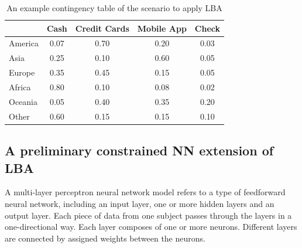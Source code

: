 \documentclass[]{interact}
\theoremstyle{plain}%
\theoremstyle{definition}
\theoremstyle{remark}
\begin{document}
\begin{table}[H]

\caption{\label{tab:example_lba}An example contingency table of the scenario to apply LBA}
\centering
\begin{tabular}[t]{lcccc}
\toprule
\textbf{ } & \textbf{Cash} & \textbf{Credit Cards} & \textbf{Mobile App} & \textbf{Check}\\
\midrule
America & 0.07 & 0.70 & 0.20 & 0.03\\
Asia & 0.25 & 0.10 & 0.60 & 0.05\\
Europe & 0.35 & 0.45 & 0.15 & 0.05\\
Africa & 0.80 & 0.10 & 0.08 & 0.02\\
Oceania & 0.05 & 0.40 & 0.35 & 0.20\\
\addlinespace
Other & 0.60 & 0.15 & 0.15 & 0.10\\
\bottomrule
\end{tabular}
\end{table}

\hypertarget{subsection:prelba}{%
\subsection{A preliminary constrained NN extension of
LBA}\label{subsection:prelba}}

A multi-layer perceptron neural network model refers to a type of
feedforward neural network, including an input layer, one or more hidden
layers and an output layer. Each piece of data from one subject passes
through the layers in a one-directional way. Each layer composes of one
or more neurons. Different layers are connected by assigned weights
between the neurons.
\end{document}
